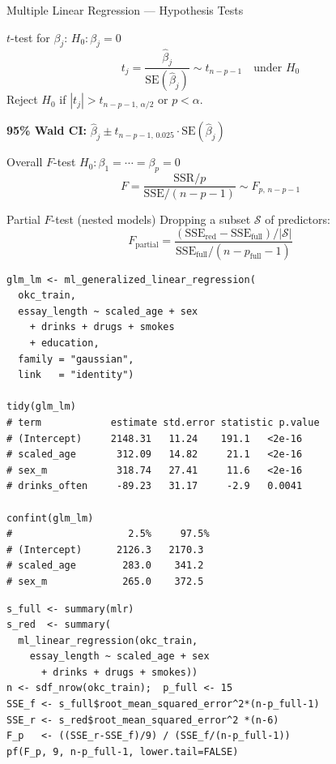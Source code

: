 \documentclass[11pt, aspectratio=169]{beamer}
\begin{document}
\begin{frame}{Multiple Linear Regression --- Hypothesis Tests}
	\begin{block}{$t$-test for $\beta_j$: $H_0: \beta_j = 0$}
				\[
				t_j = \frac{\hat\beta_j}{\mathrm{SE}(\hat\beta_j)}
				\sim t_{n-p-1}
				\quad\text{under }H_0
				\]
				Reject $H_0$ if $|t_j| > t_{n-p-1,\,\alpha/2}$ or $p < \alpha$.
				\medskip

				\textbf{95\% Wald CI:}
				$\hat\beta_j \pm t_{n-p-1,\,0.025}\cdot\mathrm{SE}(\hat\beta_j)$
			\end{block}
			\begin{block}{Overall $F$-test}
				$H_0: \beta_1 = \cdots = \beta_p = 0$
				\[
				F = \frac{\mathrm{SSR}/p}{\mathrm{SSE}/(n-p-1)} \sim F_{p,\,n-p-1}
				\]
			\end{block}
			\begin{block}{Partial $F$-test (nested models)}
				Dropping a subset $\mathcal{S}$ of predictors:
				\[
				F_{\text{partial}} =
				\frac{(\mathrm{SSE}_{\text{red}}-\mathrm{SSE}_{\text{full}})/|\mathcal{S}|}
				{\mathrm{SSE}_{\text{full}}/(n-p_{\text{full}}-1)}
				\]
			\end{block}
		\begin{lstlisting}[title={p-values via GLM (therinspark.com)}]
glm_lm <- ml_generalized_linear_regression(
  okc_train,
  essay_length ~ scaled_age + sex
    + drinks + drugs + smokes
    + education,
  family = "gaussian",
  link   = "identity")

tidy(glm_lm)
# term            estimate std.error statistic p.value
# (Intercept)     2148.31   11.24    191.1   <2e-16
# scaled_age       312.09   14.82     21.1   <2e-16
# sex_m            318.74   27.41     11.6   <2e-16
# drinks_often     -89.23   31.17     -2.9   0.0041

confint(glm_lm)
#                    2.5%     97.5%
# (Intercept)      2126.3   2170.3
# scaled_age        283.0    341.2
# sex_m             265.0    372.5
			\end{lstlisting}
			\begin{lstlisting}[title={Partial F-test: does adding education help?}]
s_full <- summary(mlr)
s_red  <- summary(
  ml_linear_regression(okc_train,
    essay_length ~ scaled_age + sex
      + drinks + drugs + smokes))
n <- sdf_nrow(okc_train);  p_full <- 15
SSE_f <- s_full$root_mean_squared_error^2*(n-p_full-1)
SSE_r <- s_red$root_mean_squared_error^2 *(n-6)
F_p   <- ((SSE_r-SSE_f)/9) / (SSE_f/(n-p_full-1))
pf(F_p, 9, n-p_full-1, lower.tail=FALSE)
			\end{lstlisting}
		\end{frame}
\end{document}
